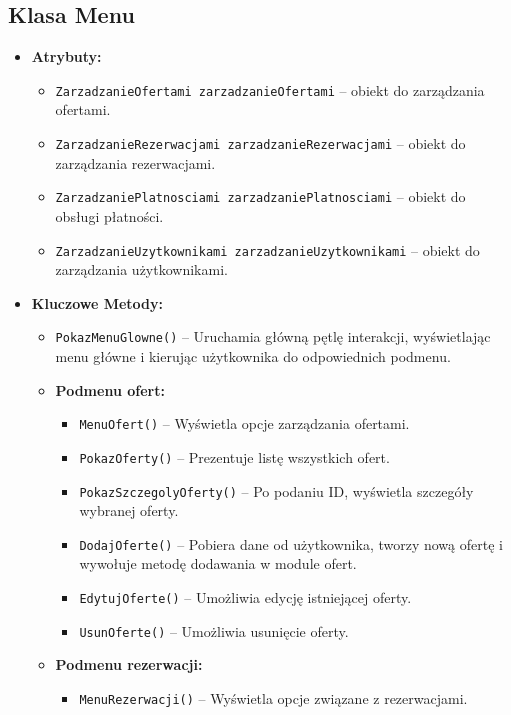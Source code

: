 \subsection*{Klasa \textbf{Menu}}
\begin{itemize}
    \item \textbf{Atrybuty:}
    \begin{itemize}
        \item \texttt{ZarzadzanieOfertami zarzadzanieOfertami} -- obiekt do zarządzania ofertami.
        \item \texttt{ZarzadzanieRezerwacjami zarzadzanieRezerwacjami} -- obiekt do zarządzania rezerwacjami.
        \item \texttt{ZarzadzaniePlatnosciami zarzadzaniePlatnosciami} -- obiekt do obsługi płatności.
        \item \texttt{ZarzadzanieUzytkownikami zarzadzanieUzytkownikami} -- obiekt do zarządzania użytkownikami.
    \end{itemize}
    \item \textbf{Kluczowe Metody:}
    \begin{itemize}
        \item \texttt{PokazMenuGlowne()} -- Uruchamia główną pętlę interakcji, wyświetlając menu główne i kierując użytkownika do odpowiednich podmenu.
        \item \textbf{Podmenu ofert:}
        \begin{itemize}
            \item \texttt{MenuOfert()} -- Wyświetla opcje zarządzania ofertami.
            \item \texttt{PokazOferty()} -- Prezentuje listę wszystkich ofert.
            \item \texttt{PokazSzczegolyOferty()} -- Po podaniu ID, wyświetla szczegóły wybranej oferty.
            \item \texttt{DodajOferte()} -- Pobiera dane od użytkownika, tworzy nową ofertę i wywołuje metodę dodawania w module ofert.
            \item \texttt{EdytujOferte()} -- Umożliwia edycję istniejącej oferty.
            \item \texttt{UsunOferte()} -- Umożliwia usunięcie oferty.
        \end{itemize}
        \item \textbf{Podmenu rezerwacji:}
        \begin{itemize}
            \item \texttt{MenuRezerwacji()} -- Wyświetla opcje związane z rezerwacjami.

\end{itemize}
\end{itemize}
\end{itemize}
